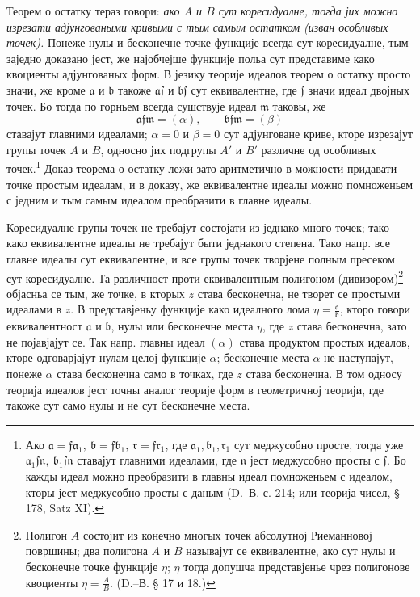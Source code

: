 ﻿\documentclass[11pt]{article}
\providecommand{\frf}{\mathfrak f}
\providecommand{\fra}{\mathfrak a}
\providecommand{\frb}{\mathfrak b}
\providecommand{\frr}{\mathfrak r}
\providecommand{\frm}{\mathfrak m}
\begin{document}
Теорем о остатку тераз говори: {\itshape ако \(A\) и \(B\) сут коресидуалне, тогда јих можно изрезати адјунговаными кривыми с тым самым остатком (изван особливых точек).} Понеже нулы и бесконечне точке функције всегда сут коресидуалне, тым заједно доказано јест, же најобчејше функције польа сут представиме како квоциенты адјунгованых форм. В језику теорије идеалов теорем о остатку просто значи, же кроме \(\fra\) и \(\frb\) такоже \(\fra\frf\) и \(\frb\frf\) сут еквивалентне, где \(\frf\) значи идеал двојных точек. Бо тогда по горньем всегда сушствује идеал \(\frm\) таковы, же
\[
\fra\frf\frm=(\alpha),\qquad \frb\frf\frm=(\beta)
\]
ставајут главними идеалами; \(\alpha=0\) и \(\beta=0\) сут адјунговане криве, кторе изрезајут групы точек \(A\) и \(B\), односно јих подгрупы \(A'\) и \(B'\) различне од особливых точек.\footnote{Ако \(\fra=\frf\fra_1,\ \frb=\frf\frb_1,\ \frr=\frf\frr_1\), где \(\fra_1,\frb_1,\frr_1\) сут меджусобно просте, тогда уже \(\fra_1\frf\mathfrak n,\ \frb_1\frf\mathfrak n\) ставајут главними идеалами, где \(\mathfrak n\) јест меджусобно просты с \(\frf\). Бо кажды идеал можно преобразити в главны идеал помноженьем с идеалом, кторы јест меджусобно просты с даным (D.--В. с. 214; или теорија чисел, § 178, Satz XI).} Доказ теорема о остатку лежи зато аритметично в можности придавати точке простым идеалам, и в доказу, же еквивалентне идеалы можно помноженьем с једним и тым самым идеалом преобразити в главне идеалы.

Коресидуалне групы точек не требајут состојати из једнако много точек; тако како еквивалентне идеалы не требајут быти једнакого степена. Тако напр. все главне идеалы сут еквивалентне, и все групы точек творјене полным пресеком сут коресидуалне. Та различност проти еквивалентным полигоном (дивизором)\footnote{Полигон \(A\) состојит из конечно многых точек абсолутној Риеманновој површины; два полигона \(A\) и \(B\) называјут се еквивалентне, ако сут нулы и бесконечне точке функције \(\eta\); \(\eta\) тогда допушча представјенье чрез полигонове квоциенты \(\eta=\frac{A}{B}\). (D.--В. § 17 и 18.)} објасньа се тым, же точке, в кторых \(z\) става бесконечна, не творет се простыми идеалами в \(z\). В представјеньу функције како идеалного лома \(\eta=\frac{\fra}{\frb}\), кторо говори еквивалентност \(\fra\) и \(\frb\), нулы или бесконечне места \(\eta\), где \(z\) става бесконечна, зато не појавјајут се. Так напр. главны идеал \((\alpha)\) става продуктом простых идеалов, кторе одговарјајут нулам целој функције \(\alpha\); бесконечне места \(\alpha\) не наступајут, понеже \(\alpha\) става бесконечна само в точках, где \(z\) става бесконечна. В том односу теорија идеалов јест точны аналог теорије форм в геометричној теорији, где такоже сут само нулы и не сут бесконечне места.
\end{document}
